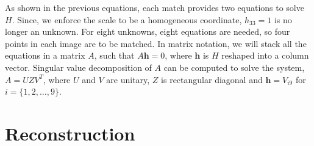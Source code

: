 \documentclass[12pt]{article}
\begin{document}
As shown in the previous equations, each match provides two equations to solve $H$.
Since, we enforce the scale to be a homogeneous coordinate, $h_{33} = 1$ is no longer an unknown.
For eight unknowns, eight equations are needed, so four points in each image are to be matched.
In matrix notation, we will stack all the equations in a matrix $A$, such that $A\mathbf{h}=0$, where $\mathbf{h}$ is $H$ reshaped into a column vector.
Singular value decomposition of $A$ can be computed to solve the system, $A = UZV^T$, where $U$ and $V$ are unitary, $Z$ is rectangular diagonal and $\mathbf{h} = V_{i9}$ for $i = \lbrace 1,2, \ldots, 9 \rbrace$.

\section{Reconstruction}
\end{document}

